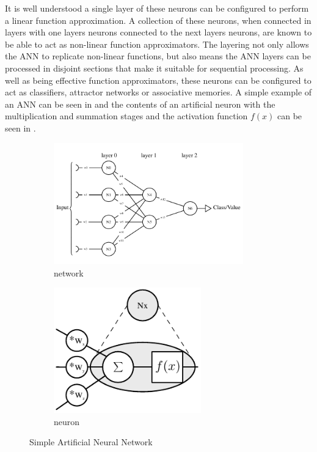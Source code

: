 It is well understood a single layer of these neurons can be configured to perform a linear function approximation.
A collection of these neurons, when connected in layers with one layers neurons connected to
the next layers neurons, are known to be able to act as non-linear function approximators.
The layering not only allows the ANN to replicate non-linear functions, but also means the ANN layers can be processed in disjoint sections that make it suitable for sequential processing.
As well as being effective function approximators, these neurons can be configured to act as 
classifiers, attractor networks or associative memories.
A simple example of an ANN can be seen in  and the contents of an artificial neuron 
with the multiplication and summation stages and the activation function $f(x)$ can be seen in . 


\begin{figure}
\centering
\begin{subfigure}{.65\textwidth}
  \centering
  \includegraphics[width=0.9\textwidth]{Chapter-1/figs/simpleANN}
  \captionsetup{justification=centering, skip=-20pt}
  \caption{network}
  \label{fig:simpleNetwork}
\end{subfigure}%
\begin{subfigure}{.3\textwidth}
  \centering
  \includegraphics[width=0.7\textwidth]{Chapter-1/figs/cellContents}
  \captionsetup{justification=centering, skip=3pt}
  \caption{neuron}
  \label{fig:cellContents}
\end{subfigure}
\captionsetup{justification=centering, skip=10pt}
\caption{Simple Artificial Neural Network}
\label{fig:Simple Artificial Neural Network}
\end{figure}

